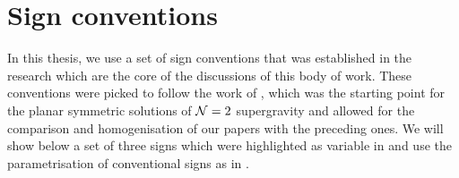 \section{Sign conventions}

In this thesis, we use a set of sign conventions that was established in the research \cite{Gutowski:2019iyo, Gutowski:2020fzb} which are the core of the discussions of this body of work. These conventions were picked to follow the work of \cite{Dempster:2015}, which was the starting point for the planar symmetric solutions of ${\cal N} = 2$ supergravity and allowed for the comparison and homogenisation of our papers with the preceding ones. We will show below a set of three signs which were highlighted as variable in \cite{Misner:1974qy} and use the parametrisation of conventional signs as in \cite{Freedman:2012zz}.

